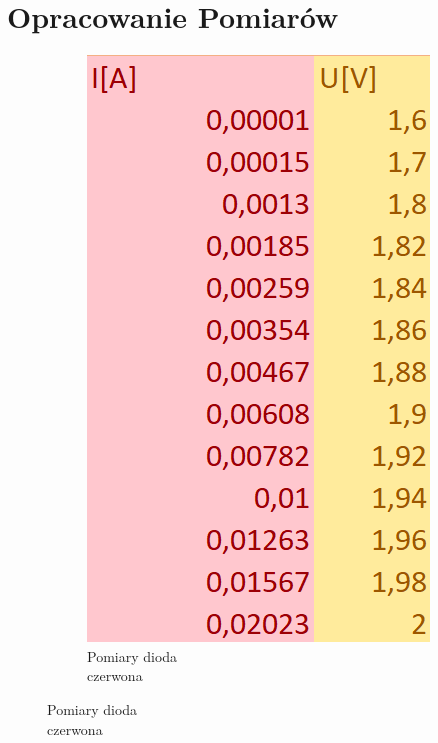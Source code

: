 \documentclass{article}
\begin{document}
\newpage

\section{Opracowanie Pomiarów}
\begin{figure}[h!]
  \centering
  \begin{subfigure}[b]{0.2\textwidth}
    \includegraphics[width=\linewidth]{Pomiary_Dioda_Czerwona.png}
     \caption{Pomiary dioda\\ czerwona}
  \end{subfigure}

\end{figure}
\end{document}
